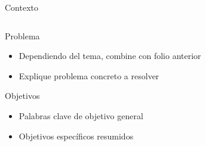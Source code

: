 \documentclass[15pt]{beamer} %
\begin{document}
\begin{frame}{Contexto}
\begin{columns}
  \end{columns}
\end{frame}

\begin{frame}{Problema}
  
  \begin{itemize}
  \item Dependiendo del tema, combine con folio anterior
  \item Explique problema concreto a resolver
  \end{itemize}
\end{frame}

\begin{frame}{Objetivos}
  
  \begin{itemize}
  \item Palabras clave de objetivo general
  \item Objetivos específicos resumidos 
  \end{itemize}
\end{frame}
\end{document}

